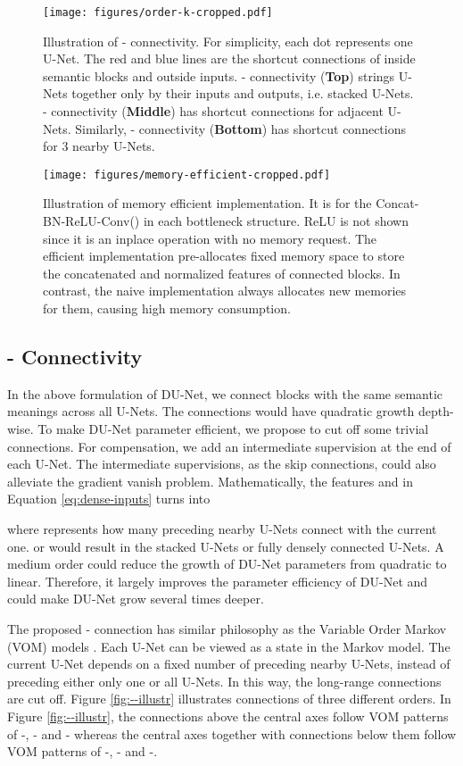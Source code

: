 \documentclass[runningheads]{llncs}
\begin{document}
\begin{figure}[t]
\centering
  \texttt{[image: figures/order-k-cropped.pdf]}
\caption{Illustration of - connectivity. For simplicity, each dot represents one U-Net. The red and blue lines are the shortcut connections of inside semantic blocks and outside inputs. - connectivity ({\bf Top}) strings U-Nets together only by their inputs and outputs, i.e. stacked U-Nets. - connectivity ({\bf Middle}) has shortcut connections for adjacent U-Nets. Similarly, - connectivity ({\bf Bottom}) has shortcut connections for 3 nearby U-Nets.}
\label{fig:--illustr}
\endminipage \hfill
{}
\centering
  \texttt{[image: figures/memory-efficient-cropped.pdf]}
\caption{Illustration of memory efficient implementation. It is for the Concat-BN-ReLU-Conv() in each bottleneck structure. ReLU is not shown since it is an inplace operation with no memory request. The efficient implementation  pre-allocates fixed memory space to store the concatenated and normalized features of connected blocks. In contrast, the naive implementation always allocates new memories for them, causing high memory consumption.}
  \label{fig:memory-efficient} \hfill
\endminipage
\end{figure}



\subsection{- Connectivity}
In the above formulation of DU-Net, we connect blocks with the same semantic meanings across all U-Nets. The connections would have quadratic growth depth-wise. To make DU-Net parameter efficient, we propose to cut off some trivial connections. For compensation, we add an intermediate supervision at the end of each U-Net. The intermediate supervisions, as the skip connections, could also alleviate the gradient vanish problem. Mathematically, the features   and  in Equation \ref{eq:dense-inputs} turns into 

where  represents how many preceding nearby U-Nets connect with the current one.  or  would result in the stacked U-Nets or fully densely connected U-Nets. A medium order could reduce the growth of DU-Net parameters from quadratic to linear. Therefore, it largely improves the parameter efficiency of DU-Net and could make DU-Net grow several times deeper.

The proposed - connection has similar philosophy as the Variable Order Markov (VOM) models \cite{begleiter2004prediction}. Each U-Net can be viewed as a state in the Markov model. The current U-Net depends on a fixed number of preceding nearby U-Nets, instead of preceding either only one or all U-Nets. In this way, the long-range connections are cut off. Figure \ref{fig:--illustr} illustrates connections of three different orders. In Figure \ref{fig:--illustr}, the connections above the central axes follow VOM patterns of -, - and - whereas the central axes together with connections below them follow VOM patterns of -, - and -.
\end{document}
